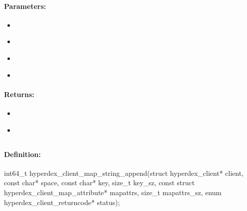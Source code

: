 \paragraph{Parameters:}
\begin{itemize}[noitemsep]
\item {}\\

\item {}\\

\item {}\\

\item {}\\

\end{itemize}

\paragraph{Returns:}
\begin{itemize}[noitemsep]
\item {}\\

\item {}\\

\end{itemize}

\pagebreak
\subsection{}
\label{api:c:map_string_append}


\paragraph{Definition:}
\begin{ccode}
int64_t hyperdex_client_map_string_append(struct hyperdex_client* client,
        const char* space,
        const char* key, size_t key_sz,
        const struct hyperdex_client_map_attribute* mapattrs, size_t mapattrs_sz,
        enum hyperdex_client_returncode* status);
\end{ccode}

